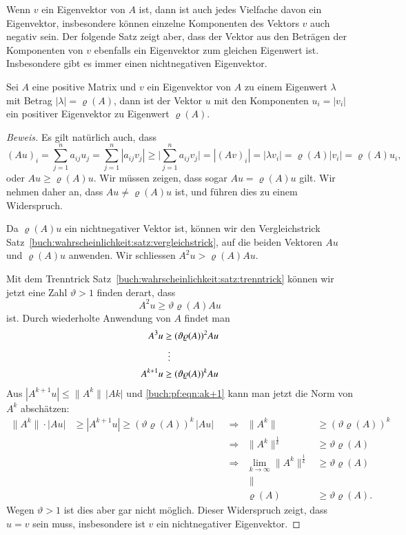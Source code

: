 Wenn $v$ ein Eigenvektor von $A$ ist, dann ist auch jedes Vielfache
davon ein Eigenvektor, insbesondere können einzelne Komponenten
des Vektors $v$ auch negativ sein.
Der folgende Satz zeigt aber, dass der Vektor aus den Beträgen
der Komponenten von $v$ ebenfalls ein Eigenvektor zum 
gleichen Eigenwert ist.
Insbesondere gibt es immer einen nichtnegativen Eigenvektor.

\begin{satz}
\label{buch:wahrscheinlichkeit:satz:positivereigenvektor}
Sei $A$ eine positive Matrix und $v$ ein Eigenvektor von $A$ zu einem
Eigenwert $\lambda$ mit Betrag $|\lambda|=\varrho(A)$,
dann ist der Vektor $u$  mit den Komponenten $u_i=|v_i|$ ein
positiver Eigenvektor zu Eigenwert $\varrho(A)$.
\end{satz}

\begin{proof}[Beweis]
Es gilt natürlich auch, dass
\[
(Au)_i
=
\sum_{j=1}^n a_{i\!j}u_j
=
\sum_{j=1}^n |a_{i\!j}v_j|
\ge
\biggl|
\sum_{j=1}^n a_{i\!j}v_j
\biggr|
=
|(Av)_i|
=
|\lambda v_i|
=
\varrho(A) |v_i|
=
\varrho(A) u_i,
\]
oder $Au \ge \varrho(A)u$.
Wir müssen zeigen, dass sogar $Au=\varrho(A)u$ gilt.
Wir nehmen daher an, dass $Au\ne \varrho(A)u$ ist, und führen dies zu
einem Widerspruch.

Da $\varrho(A)u$ ein nichtnegativer Vektor ist, können wir den Vergleichstrick
Satz~\ref{buch:wahrscheinlichkeit:satz:vergleichstrick}, auf die beiden
Vektoren $Au$ und $\varrho(A)u$ anwenden.
Wir schliessen $A^2u > \varrho(A)Au$.

Mit dem Trenntrick
Satz~\ref{buch:wahrscheinlichkeit:satz:trenntrick}
können wir jetzt eine Zahl $\vartheta>1$ finden derart, dass
\[
A^2 u \ge \vartheta \varrho(A) Au
\]
ist.
Durch wiederholte Anwendung von $A$ findet man
\begin{align}
A^3 u & \ge (\vartheta \varrho(A))^2 Au
\notag
\\
&\phantom{0}\vdots
\notag
\\
A^{k+1} u & \ge (\vartheta \varrho(A))^{k} Au
\label{buch:pf:eqn:ak+1}
\end{align}
Aus $|A^{k+1}u| \le \|A^k\|\,|Ak|$ und
\eqref{buch:pf:eqn:ak+1} kann man jetzt die Norm von $A^k$ abschätzen:
\[
\begin{aligned}
\| A^{k}\|\cdot |Au|
&\ge 
| A^{k+1}u|
\ge
(\vartheta\varrho(A))^{k}\, |Au|
&&
\Rightarrow
&
\|A^k\| &\ge  (\vartheta\varrho(A))^k 
\\
&&&\Rightarrow&
\|A^k\|^{\frac{1}{k}} &\ge \vartheta\varrho(A)
\\
&&&\Rightarrow&
\lim_{k\to\infty}
\|A^k\|^{\frac{1}{k}} &\ge \vartheta\varrho(A)
\\
&&&&\|\phantom{00}&
\\
&&&%
&
\varrho(A)&\ge \vartheta\varrho(A).
\end{aligned}
\]
Wegen $\vartheta>1$ ist dies aber gar nicht möglich.
Dieser Widerspruch zeigt, dass $u=v$ sein muss, insbesondere ist
$v$ ein nichtnegativer Eigenvektor.
\end{proof}


